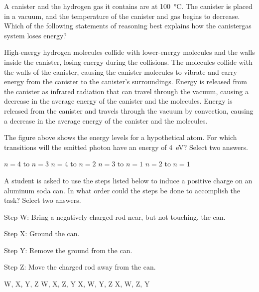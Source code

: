 \documentclass[12pt]{exam}
\newcommand{\pic}[2]{
  \begin{center}
    \texttt{[image: \#2]}
  \end{center}
}
\begin{document}
\begin{questions}
  \question A canister and the hydrogen gas it contains are at
  \SI{100}{\celsius}. The canister is placed in a vacuum, and the temperature
  of the canister and gas begins to decrease. Which of the following statements
  of reasoning best explains how the canistergas system loses energy?
  \begin{choices}
    \choice High-energy hydrogen molecules collide with lower-energy molecules
    and the walls inside the canister, losing energy during the collisions.
    \choice The molecules collide with the walls of the canister, causing the
    canister molecules to vibrate and carry energy from the canister to the
    canister's surroundings.
    \choice Energy is released from the canister as infrared radiation that can
    travel through the vacuum, causing a decrease in the average energy of the
    canister and the molecules.
    \choice Energy is released from the canister and travels through the vacuum
    by convection, causing a decrease in the average energy of the canister and
    the molecules.
  \end{choices}
  \vspace{.7in}
  
  \uplevel{
    \pic{.34}{energy-levels}
  }
  \question The figure above shows the energy levels for a hypothetical atom.
  For which transitions will the emitted photon have an energy of
  \SI{4}{\electronvolt}? Select two answers.
  \begin{choices}
    \choice $n=4$ to $n=3$
    \choice $n=4$ to $n=2$
    \choice $n=3$ to $n=1$
    \choice $n=2$ to $n=1$
  \end{choices}

  \question A student is asked to use the steps listed below to induce a
  positive charge on an aluminum soda can. In what order could the steps be
  done to accomplish the task? Select two answers.
  
  Step W: Bring a negatively charged rod near, but not touching, the can.

  Step X: Ground the can.

  Step Y: Remove the ground from the can.

  Step Z: Move the charged rod away from the can.
  \begin{choices}
    \choice W, X, Y, Z
    \choice W, X, Z, Y
    \choice X, W, Y, Z
    \choice X, W, Z, Y
  \end{choices}


\end{questions}
\end{document}

